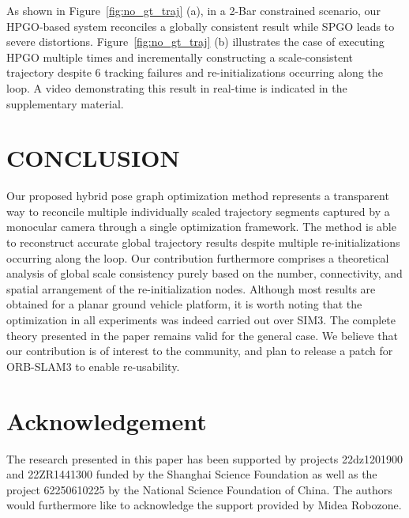 \documentclass[letterpaper, 10 pt, conference]{ieeeconf}  %
\begin{document}

As shown in Figure~\ref{fig:no_gt_traj} (a), in a 2-Bar constrained scenario, our HPGO-based system reconciles a globally consistent result while SPGO leads to severe distortions. Figure~\ref{fig:no_gt_traj} (b) illustrates the case of executing HPGO multiple times and incrementally constructing a scale-consistent trajectory despite 6 tracking failures and re-initializations occurring along the loop. A video demonstrating this result in real-time is indicated in the supplementary material.


\section{CONCLUSION}
\label{sec:conclusion}

Our proposed hybrid pose graph optimization method represents a transparent way to reconcile multiple individually scaled trajectory segments captured by a monocular camera through a single optimization framework. The method is able to reconstruct accurate global trajectory results despite multiple re-initializations occurring along the loop. Our contribution furthermore comprises a theoretical analysis of global scale consistency purely based on the number, connectivity, and spatial arrangement of the re-initialization nodes. Although most results are obtained for a planar ground vehicle platform, it is worth noting that the optimization in all experiments was indeed carried out over SIM3. The complete theory presented in the paper remains valid for the general case. We believe that our contribution is of interest to the community, and plan to release a patch for ORB-SLAM3 to enable re-usability.

\section{Acknowledgement}
The research presented in this paper has been supported by projects 22dz1201900 and 22ZR1441300 funded by the Shanghai Science Foundation as well as the project 62250610225 by the National Science Foundation of China. The authors would furthermore like to acknowledge the support provided by Midea Robozone.


\end{document}
